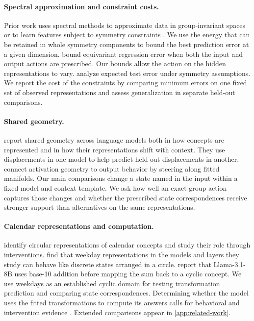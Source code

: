 \paragraph{Spectral approximation and constraint costs.}
Prior work uses spectral methods to approximate data in group-invariant spaces or to learn features subject to symmetry constraints \citep{barbieri2020approximation,koyama2024fourier,ordonez2026inference}.
We use the energy that can be retained in whole symmetry components to bound the best prediction error at a given dimension.
\citet{wang2023equivariance} bound equivariant regression error when both the input and output actions are prescribed. Our bounds allow the action on the hidden representations to vary.
\citet{elesedy2021generalisation} analyze expected test error under symmetry assumptions. We report the cost of the constraints by comparing minimum errors on one fixed set of observed representations and assess generalization in separate held-out comparisons.

\paragraph{Shared geometry.}
\citet{hu2026language} report shared geometry across language models both in how concepts are represented and in how their representations shift with context. They use displacements in one model to help predict held-out displacements in another.
\citet{wurgaft2026manifold} connect activation geometry to output behavior by steering along fitted manifolds.
Our main comparisons change a state named in the input within a fixed model and context template. We ask how well an exact group action captures those changes and whether the prescribed state correspondences receive stronger support than alternatives on the same representations.

\paragraph{Calendar representations and computation.}
\citet{engels2025notall} identify circular representations of calendar concepts and study their role through interventions.
\citet{gupta2026spokes} find that weekday representations in the models and layers they study can behave like discrete states arranged in a circle.
\citet{feucht2026arithmetic} report that Llama-3.1-8B uses base-10 addition before mapping the sum back to a cyclic concept.
We use weekdays as an established cyclic domain for testing transformation prediction and comparing state correspondences.
Determining whether the model uses the fitted transformations to compute its answers calls for behavioral and intervention evidence \citep{makelov2024illusion,geiger2025causal}.
Extended comparisons appear in \cref{app:related-work}.
